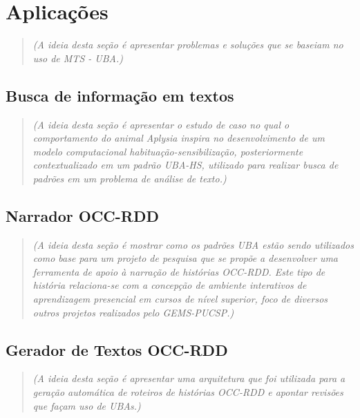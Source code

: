 \section{Aplicações}
\label{cap:aplicacoes} %


\begin{quote}\textit{(A ideia desta seção é apresentar problemas e soluções que se baseiam no uso de MTS - UBA.)}\end{quote}

\subsection{Busca de informação em textos}

\begin{quote}\textit{(A ideia desta seção é apresentar o estudo de caso no qual o comportamento do animal Aplysia inspira no desenvolvimento de um modelo computacional habituação-sensibilização, posteriormente contextualizado em um padrão UBA-HS, utilizado para realizar busca de padrões em um problema de análise de texto.)}\end{quote}

\subsection{Narrador OCC-RDD}

\begin{quote}\textit{(A ideia desta seção é mostrar como os padrões UBA estão sendo utilizados como base para um projeto de pesquisa que se propõe a desenvolver uma ferramenta de apoio à narração de histórias OCC-RDD. Este tipo de história relaciona-se com a concepção de ambiente interativos de aprendizagem presencial em cursos de nível superior, foco de diversos outros projetos realizados pelo GEMS-PUCSP.)}\end{quote}

\subsection{Gerador de Textos OCC-RDD}

\begin{quote}\textit{(A ideia desta seção é apresentar uma arquitetura que foi utilizada para a geração automática de roteiros de histórias OCC-RDD e apontar revisões que façam uso de UBAs.)}\end{quote}

